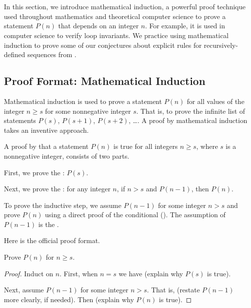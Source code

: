 \section{\secmathind}
\label{sec_math_ind}

In this section, we introduce mathematical induction, a powerful proof technique used throughout mathematics and theoretical computer science to prove a statement $P(n)$ that depends on an integer $n$. For example, it is used in computer science to verify loop invariants. We practice using mathematical induction to prove some of our conjectures about explicit rules for recursively-defined sequences from .   


\newcommand{\subpffmathind}{Proof Format: Mathematical Induction}
\subsection{\subpffmathind}
\label{sub_pff_math_induction}

Mathematical induction is used to prove a statement $P(n)$ for all values of the integer $n \ge s$ for some nonnegative integer $s$.  That is, to prove the infinite list of statements $P(s)$, $P(s+1)$, $P(s+2)$, \ldots. A proof by mathematical induction takes an inventive approach.

\begin{defn}
\label{defn_math_ind}
  A proof by  that a statement $P(n)$ is true for all integers $n \ge s$, where $s$ is a nonnegative integer, consists of two parts.
      \begin{apart}
          \item First, we prove the : $P(s)$.
          \item  Next, we prove the : for any integer $n$, if $n > s$ and $P(n-1)$, then $P(n)$.
          \item To prove the inductive step, we assume $P(n-1)$ for some integer $n > s$ and prove $P(n)$ using a direct proof of the conditional ().  The assumption of $P(n-1)$ is the .
      \end{apart}
\end{defn}

Here is the official proof format.

\begin{pff}
\label{pff_math_ind}
    Prove $P(n)$ for $n \ge s$.
    \begin{proof}
        Induct on $n$. First, when $n=s$ we have (explain why $P(s)$ is true).

        Next, assume $P(n-1)$ for some integer $n > s$. That is, (restate $P(n-1)$ more clearly, if needed). Then (explain why $P(n)$ is true).
    \end{proof}
\end{pff}

